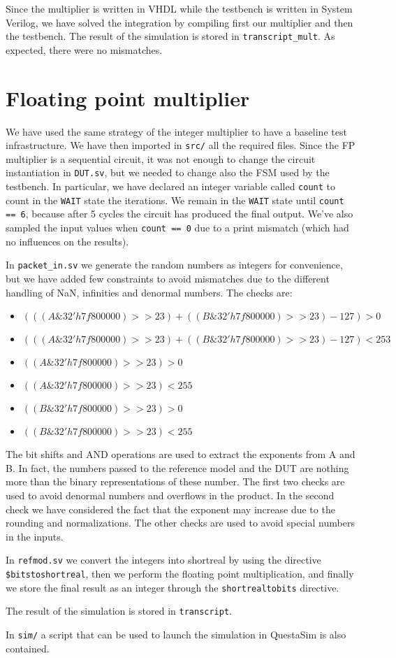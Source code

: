 Since the multiplier is written in VHDL while the testbench is written in System Verilog, we have solved the
integration by compiling first our multiplier and then the testbench. The result of the simulation is stored
in \verb|transcript_mult|. As expected, there were no mismatches.

\section{Floating point multiplier}
We have used the same strategy of the integer multiplier to have a baseline test infrastructure. We have then
imported in \verb|src/| all the required files. Since the FP multiplier is a sequential circuit, it was not enough
to change the circuit instantiation in \verb|DUT.sv|, but we needed to change also the FSM used by the testbench.
In particular, we have declared an integer variable called \verb|count| to count in the \verb|WAIT| state the
iterations. We remain in the \verb|WAIT| state until \verb|count == 6|, because after 5 cycles the circuit has
produced the final output. We've also sampled the input values when \verb|count == 0| due to a print mismatch
(which had no influences on the results).

In \verb|packet_in.sv| we generate the random numbers as integers for convenience, but we have added few
constraints to avoid mismatches due to the different handling of NaN, infinities and denormal numbers.
The checks are:

\begin{itemize}
    \item $(((A \& 32'h7f800000)>>23) + ((B \& 32'h7f800000)>>23) - 127) > 0$
    \item $(((A \& 32'h7f800000)>>23) + ((B \& 32'h7f800000)>>23) - 127) < 253$
    \item $((A \& 32'h7f800000)>>23) > 0$
    \item $((A \& 32'h7f800000)>>23) < 255$
    \item $((B \& 32'h7f800000)>>23) > 0$
    \item $((B \& 32'h7f800000)>>23) < 255$
\end{itemize}

The bit shifts and AND operations are used to extract the exponents from A and B. In fact, the numbers passed
to the reference model and the DUT are nothing more than the binary representations of these number.
The first two checks are used to avoid denormal numbers and overflows in the product. In the second check
we have considered the fact that the exponent may increase due to the rounding and normalizations.
The other checks are used to avoid special numbers in the inputs.

In \verb|refmod.sv| we convert the integers into shortreal by using the directive \verb|$bitstoshortreal|,
then we perform the floating point multiplication, and finally we store the final result as an integer through
the \verb|shortrealtobits| directive.

The result of the simulation is stored in \verb|transcript|.

In \verb|sim/| a script that can be used to launch the simulation in QuestaSim is also contained.